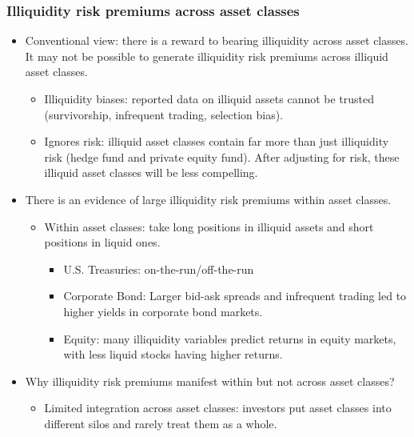 \subsubsection{Illiquidity risk premiums across asset classes}
\begin{itemize}
\item Conventional view: there is a reward to bearing illiquidity across asset classes. It may not be possible to generate illiquidity risk premiums across illiquid asset classes.
    \begin{itemize}
    \item Illiquidity biases: reported data on illiquid assets cannot be trusted (survivorship, infrequent trading, selection bias).
    \item Ignores risk: illiquid asset classes contain far more than just illiquidity risk (hedge fund and private equity fund). After adjusting for risk, these illiquid asset classes will be less compelling.
    \end{itemize}
    
\item There is an evidence of large illiquidity risk premiums within asset classes.
    \begin{itemize}
    \item Within asset classes: take long positions in illiquid assets and short positions in liquid ones.
        \begin{itemize}
        \item U.S. Treasuries: on-the-run/off-the-run
        \item Corporate Bond: Larger bid-ask spreads and infrequent trading led to higher yields in corporate bond markets.
        \item Equity: many illiquidity variables predict returns in equity markets, with less liquid stocks having higher returns.
        \end{itemize}
    \end{itemize}
    
\item Why illiquidity risk premiums manifest within but not across asset classes?
    \begin{itemize}
    \item Limited integration across asset classes: investors put asset classes into different silos and rarely treat them as a whole.
    \end{itemize}
    
\end{itemize}



